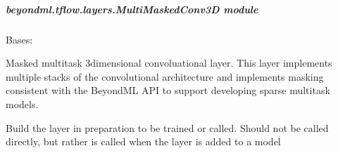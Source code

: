 \documentclass[letterpaper,10pt,english]{sphinxmanual}
\begin{document}
\subparagraph{beyondml.tflow.layers.MultiMaskedConv3D module}
\label{\detokenize{beyondml.tflow.layers:module-beyondml.tflow.layers.MultiMaskedConv3D}}\label{\detokenize{beyondml.tflow.layers:beyondml-tflow-layers-multimaskedconv3d-module}}

\begin{fulllineitems}
\label{\detokenize{beyondml.tflow.layers:beyondml.tflow.layers.MultiMaskedConv3D.MultiMaskedConv3D}}
\pysigstartsignatures
{}
\pysigstopsignatures
\sphinxAtStartPar
Bases: 

\sphinxAtStartPar
Masked multitask 3\sphinxhyphen{}dimensional convoluational layer. This layer implements
multiple stacks of the convolutional architecture and implements masking
consistent with the BeyondML API to support developing sparse multitask models.

\begin{fulllineitems}
\label{\detokenize{beyondml.tflow.layers:beyondml.tflow.layers.MultiMaskedConv3D.MultiMaskedConv3D.build}}
\pysigstartsignatures
{}
\pysigstopsignatures
\sphinxAtStartPar
Build the layer in preparation to be trained or called. Should not be called directly,
but rather is called when the layer is added to a model

\end{fulllineitems}



\end{fulllineitems}
\end{document}
